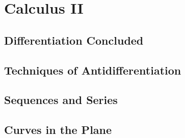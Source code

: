 \part{Calculus II}

\clearpage{\pagestyle{empty}\cleardoublepage}
\chapter{Differentiation Concluded}\label{chapter:diff_conc}
\thispagestyle{empty}







\clearpage{\pagestyle{empty}\cleardoublepage}
\chapter{Techniques of Antidifferentiation}\label{chapter:anti_tech}
\thispagestyle{empty}







\clearpage{\pagestyle{empty}\cleardoublepage}
\chapter{Sequences and Series}\label{chapter:sequences_series}
\thispagestyle{empty}









\clearpage{\pagestyle{empty}\cleardoublepage}
\chapter{Curves in the Plane}
\thispagestyle{empty}





